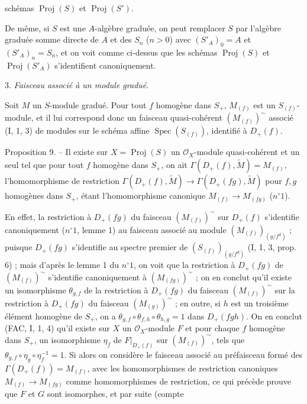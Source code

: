 schémas $\operatorname{Proj}(S)$ et $\operatorname{Proj}(S')$.

De même, si $S$ est une $A$-algèbre graduée, on peut remplacer $S$ par l'algèbre graduée somme directe de $A$ et des $S_n$ ($n>0$) avec $(S'_A)_0 = A$ et $(S'_A)_n = S_n$, et on voit comme ci-dessus que les schémas $\operatorname{Proj}(S)$ et $\operatorname{Proj}(S'_A)$ s'identifient canoniquement.

3. \emph{Faisceau associé à un module gradué}.

Soit $M$ un $S$-module gradué. Pour tout $f$ homogène dans $S_+$, $M_{(f)}$ est un $S_{(f)}$-module, et il lui correspond donc un faisceau quasi-cohérent $(M_{(f)})^{\sim}$ associé (I, 1, 3) de modules sur le schéma affine $\operatorname{Spec}(S_{(f)})$, identifié à $D_+(f)$.

Proposition 9. -- Il existe sur $X = \operatorname{Proj}(S)$ un $\mathcal{O}_X$-module quasi-cohérent et un seul tel que pour tout $f$ homogène dans $S_+$, on ait $\Gamma(D_+(f), \widetilde{M}) = M_{(f)}$, l'homomorphisme de restriction $\Gamma(D_+(f), \widetilde{M}) \to \Gamma(D_+(fg), \widetilde{M})$ pour $f, g$ homogènes dans $S_+$, étant l'homomorphisme canonique $M_{(f)} \to M_{(fg)}$ ($n^{\circ}1$).

En effet, la restriction à $D_+(fg)$ du faisceau $(M_{(f)})^{\sim}$ sur $D_+(f)$ s'identifie canoniquement ($n^{\circ}1$, lemme 1) au faisceau associé au module $(M_{(f)})_{(g/f^d)}$ ; puisque $D_+(fg)$ s'identifie au spectre premier de $(S_{(f)})_{(g/f^d)}$ (I, 1, 3, prop. 6) ; mais d'après le lemme 1 du $n^{\circ}1$, on voit que la restriction à $D_+(fg)$ de $(M_{(f)})^{\sim}$ s'identifie canoniquement à $(M_{(fg)})^{\sim}$ ; on en conclut qu'il existe un isomorphisme $\theta_{g,f}$ de la restriction à $D_+(fg)$ du faisceau $(M_{(f)})^{\sim}$ sur la restriction à $D_+(fg)$ du faisceau $(M_{(g)})^{\sim}$ ; en outre, si $h$ est un troisième élément homogène de $S_+$, on a $\theta_{g,f} \circ \theta_{f,h} \circ \theta_{h,g} = 1$ dans $D_+(fgh)$. On en conclut (FAC, I, 1, 4) qu'il existe sur $X$ un $\mathcal{O}_X$-module $F$ et pour chaque $f$ homogène dans $S_+$, un isomorphisme $\eta_f$ de $F|_{D_+(f)}$ sur $(M_{(f)})^{\sim}$, tels que $\theta_{g,f} \circ \eta_g \circ \eta_f^{-1} = 1$. Si alors on considère le faisceau associé au préfaisceau formé des $\Gamma(D_+(f)) = M_{(f)}$, avec les homomorphismes de restriction canoniques $M_{(f)} \to M_{(fg)}$ comme homomorphismes de restriction, ce qui précède prouve que $F$ et $G$ sont isomorphes, et par suite (compte

